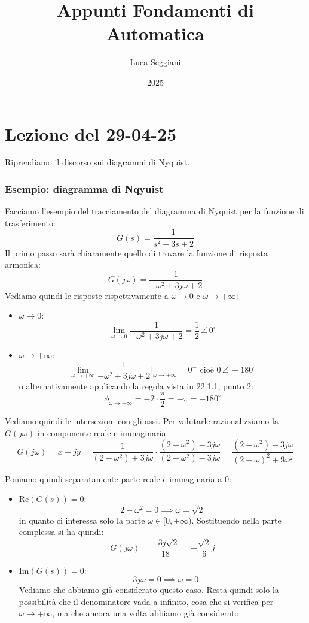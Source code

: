 \documentclass[a4paper,11pt]{article}
\title{Appunti Fondamenti di Automatica}
\author{Luca Seggiani}
\date{2025}
\begin{document}
\section{Lezione del 29-04-25}

\thispagestyle{empty}
\pagestyle{fancy}

Riprendiamo il discorso sui diagrammi di Nyquist.

\subsubsection{Esempio: diagramma di Nqyuist}
Facciamo l'esempio del tracciamento del diagramma di Nyquist per la funzione di trasferimento:
$$
G(s) = \frac{1}{s^2 + 3s + 2}
$$
Il primo passo sarà chiaramente quello di trovare la funzione di risposta armonica:
$$
G(j \omega) = \frac{1}{-\omega^2 + 3 j \omega + 2}
$$
Vediamo quindi le risposte rispettivamente a $\omega \rightarrow 0$ e $\omega \rightarrow + \infty$:
\begin{itemize}
	\item $\omega \rightarrow 0$:
		$$
		\lim_{\omega \rightarrow 0} \frac{1}{-\omega^2 + 3 j \omega + 2} = \frac{1}{2} \, \angle \, 0^\circ
		$$
	\item $\omega \rightarrow +\infty$:
		$$
		\lim_{\omega \rightarrow +\infty} \frac{1}{-\omega^2 + 3 j \omega + 2} \Big|_{\omega \rightarrow + \infty} = 0^- \text{ cioè } 0 \, \angle \, -180^\circ
		$$
		o alternativamente applicando la regola vista in 22.1.1, punto 2:
		$$
		\phi_{\omega \rightarrow + \infty} = - 2 \cdot \frac{\pi}{2} = - \pi = -180^\circ
		$$
\end{itemize}

Vediamo quindi le intersezioni con gli assi.
Per valutarle razionalizziamo la $G(j \omega)$ in componente reale e immaginaria:
$$
G(j \omega) = x + j y = \frac{1}{(2 - \omega^2) + 3 j \omega} \cdot \frac{(2 - \omega^2) - 3 j \omega}{(2 - \omega^2) - 3 j \omega}
= \frac{(2 - \omega^2) - 3 j \omega}{(2 - \omega)^2 + 9 \omega^2}
$$

Poniamo quindi separatamente parte reale e immaginaria a 0:
\begin{itemize}
	\item $\mathrm{Re}(G(s)) = 0$:
		$$
			2 - \omega^2 = 0 \implies \omega = \sqrt{2}
		$$
		in quanto ci interessa solo la parte $\omega \in [0, +\infty)$.
		Sostituendo nella parte complessa si ha quindi:
		$$
		G(j\omega) = \frac{-3 j \sqrt{2}}{18} = -\frac{\sqrt{2}}{6} j 
		$$
	\item $\mathrm{Im}(G(s)) = 0$:
		$$
			-3 j \omega = 0 \implies \omega = 0
		$$
		Vediamo che abbiamo già considerato questo caso.
		Resta quindi solo la possibilità che il denominatore vada a infinito, cosa che si verifica per $\omega \rightarrow + \infty$, ma che ancora una volta abbiamo già considerato.
\end{itemize}
\end{document}

